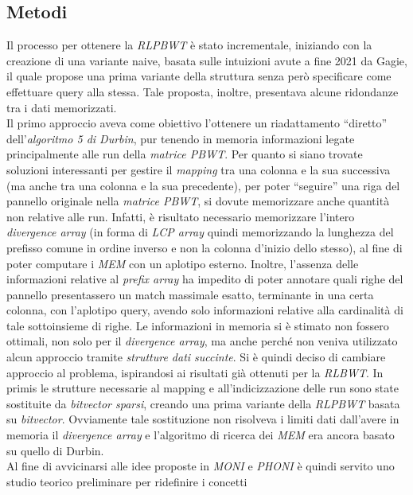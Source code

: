 \documentclass[a4paper,11pt, oneside,italian]{article}
\begin{document}
\subsection*{Metodi}
Il processo per ottenere la \textit{RLPBWT} è stato incrementale,
iniziando con la creazione di una variante naive, basata sulle intuizioni avute
a fine 2021 da Gagie, il quale propose una prima variante della struttura senza
però specificare come effettuare query alla stessa. Tale proposta, inoltre,
presentava alcune ridondanze tra i dati memorizzati.\\
Il primo approccio aveva come obiettivo l'ottenere un riadattamento ``diretto''
dell'\textit{algoritmo 5 di Durbin}, pur tenendo in memoria informazioni legate
principalmente alle run della \textit{matrice PBWT}. Per quanto si siano trovate
soluzioni interessanti per gestire il \textit{mapping} tra una colonna e la sua
successiva (ma anche tra una colonna e la sua precedente), per poter
``seguire'' una riga del pannello originale nella 
\textit{matrice PBWT}, si dovute memorizzare anche quantità non relative alle
run.  Infatti, è risultato necessario memorizzare l'intero
\textit{divergence array} (in forma di \textit{LCP array} quindi
memorizzando la lunghezza del prefisso comune in ordine inverso e non la colonna
d'inizio dello stesso), al fine di poter computare i \textit{MEM} con
un aplotipo esterno. Inoltre, l'assenza delle informazioni relative al
\textit{prefix array} ha impedito di poter annotare quali righe del pannello
presentassero un match massimale esatto, terminante in una certa colonna, con
l'aplotipo query, avendo solo 
informazioni relative alla cardinalità di tale sottoinsieme di righe. Le
informazioni in memoria si è 
stimato non fossero ottimali, non solo per il \textit{divergence array}, ma anche
perché non veniva utilizzato alcun approccio tramite \textit{strutture dati
  succinte}. Si è quindi deciso di
cambiare approccio al problema, ispirandosi ai risultati già ottenuti per la
\textit{RLBWT}. In primis le strutture necessarie al mapping e
all'indicizzazione delle run sono state sostituite da \textit{bitvector
  sparsi}, creando una prima variante della \textit{RLPBWT} basata su
\textit{bitvector}. Ovviamente tale sostituzione non risolveva i limiti dati
dall'avere in memoria il \textit{divergence array} e l'algoritmo di ricerca dei
\textit{MEM} era ancora basato su quello di Durbin. \\
Al fine di avvicinarsi alle idee proposte in \textit{MONI} e \textit{PHONI} è
quindi servito uno studio teorico preliminare per ridefinire i concetti
\end{document}
